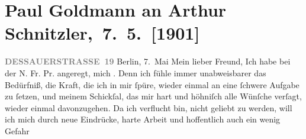 

         
         \renewcommand{\erwaehntePersonen}{Personen: Richard Beer-Hofmann, Ludwig Brefeld, Rosa Freudenthal, Clementine Goldmann, Ernst von Hammerstein-Loxten, Johannes von Miquel, Emil Rechert, Olga Schnitzler, Elisabeth Steinrück}
         \renewcommand{\erwaehnteInstitutionen}{Institutionen: Neue Freie Presse}
         \renewcommand{\erwaehnteOrte}{Orte: Berlin, Dessauer Straße, Elbe, Engadin, Hannover, Makedonien, Mittellandkanal, Nordmazedonien, Preußen, Welsberg-Taisten, Wien, Wörthersee}
         \renewcommand{\erwaehnteWerke}{Werke: Die verhaßte Korrektheit. Wiener Novellette, Frankfurter Zeitung, Frau Bertha Garlan. Roman}
               \section[ Paul Goldmann an Arthur Schnitzler, 7. 5. {[}1901{]}]{ Paul Goldmann an Arthur Schnitzler, 7. 5. {[}1901{]}}\nopagebreak{}\rehead{ }\begin{ledgroupsized}[t]{13cm}\normalsize\beginnumbering \toendnotes[C]{\smallbreak\pagebreak[2]} 
\toendnotes[C]{\smallbreak}\pstart
           \noindent{}\raggedleft{}{\pb}\textcolor{gray}{\textbf{DESSAUERSTRASSE 19}}\pend
           \pstart
           Berlin, 7. Mai\pend
           \pstart\center{}Mein lieber Freund,\pend\pstart
           Ich habe bei der N. Fr. Pr. angeregt, mich
                  \label{K_L03065-1v}\label{K_L03065-1h}. Denn ich fühle immer unabweisbarer
               das Bedürfniß, die Kraft, die ich in mir ſpüre, wieder einmal an eine ſchwere Aufgabe
               zu ſetzen, und meinem Schickſal, das mir hart und höhniſch alle Wünſche verſagt,
               wieder einmal davonzugehen. Da ich verflucht bin, nicht geliebt zu werden, will ich
               mich \strikeout{\textcolor{gray}{×}\-\textcolor{gray}{×}\-\textcolor{gray}{×}\-\textcolor{gray}{×}\-\textcolor{gray}{×}\-\textcolor{gray}{×}\-\textcolor{gray}{×}\-\textcolor{gray}{×}\-\textcolor{gray}{×}\-\textcolor{gray}{×}\-\textcolor{gray}{×}\-\textcolor{gray}{×}} durch neue Eindrücke, harte Arbeit und hoffentlich auch ein wenig Gefahr

\end{ledgroupsized}
